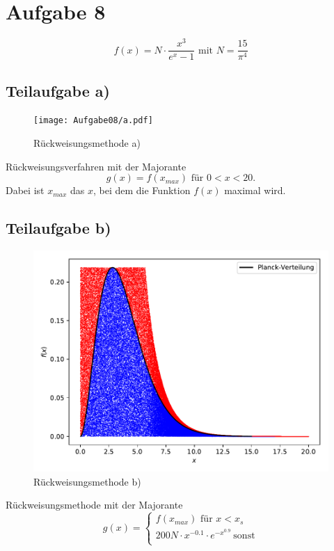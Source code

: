 \section{Aufgabe 8}
\begin{equation}
  f(x)=N \cdot \frac{x^3}{e^x-1} \text{  mit } N=\frac{15}{\pi^4}
\end{equation}
\subsection{Teilaufgabe a)} \label{sec:8a}
\begin{figure}[H]
  \centering
  \texttt{[image: Aufgabe08/a.pdf]}
  \caption{Rückweisungsmethode a)}
  \label{fig:rwm1}
\end{figure}
Rückweisungsverfahren mit der Majorante
\begin{equation}
  g(x)=f(x_{max}) \text{ für } 0 < x < 20 \text{.}
\end{equation}
Dabei ist $x_{max}$ das $x$, bei dem die Funktion $f(x)$ maximal wird.
\subsection{Teilaufgabe b)} \label{sec:8b}
\begin{figure}[H]
  \centering
  \includegraphics{Aufgabe08/b.pdf}
  \caption{Rückweisungsmethode b)}
  \label{fig:rwm2}
\end{figure}

Rückweisungsmethode mit der Majorante
\begin{equation}
  g(x)=
  \begin{cases}
    f(x_{max}) \text{ für }  x < x_s \\
    200N \cdot x^{-0.1} \cdot e^{-x^{0.9}} \: \text{sonst}\\
\end{cases}
\end{equation}

